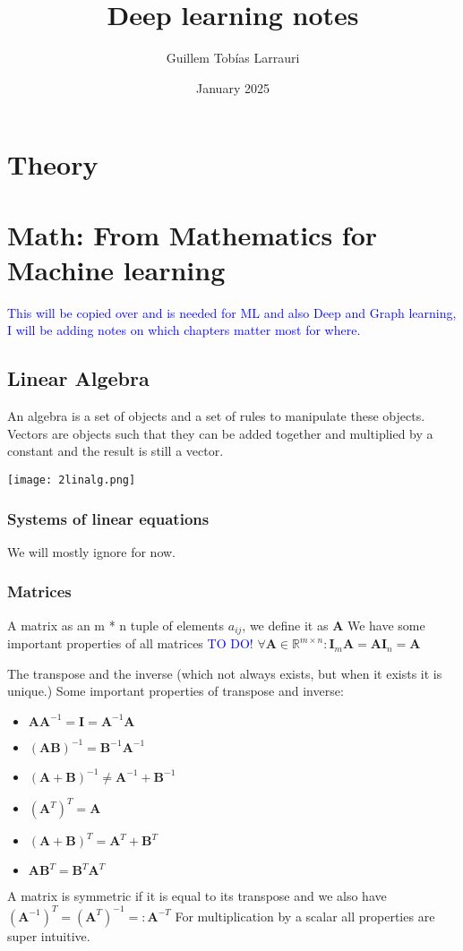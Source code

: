 \documentclass{article}
\title{Deep learning notes}
\author{Guillem Tobías Larrauri}
\date{January 2025}
\newcommand{\tblue}[1]{\textcolor{blue}{#1}}
\begin{document}
\maketitle

\section{Theory}


\section{Math: From Mathematics for Machine learning}
\tblue{This will be copied over and is needed for ML and also Deep and Graph learning,
I will be adding notes on which chapters matter most for where.}

\subsection{Linear Algebra}
An algebra is a set of objects and a set of rules to manipulate these objects.
Vectors are objects such that they can be added together and multiplied by a constant and the result is still a vector.
\begin{center}
    \texttt{[image: 2linalg.png]} %
\end{center}
\subsubsection{Systems of linear equations}
We will mostly ignore for now.

\subsubsection{Matrices}
A matrix as an m * n tuple of elements $a_{ij}$, we define it as \textbf{A}
We have some important properties of all matrices \tblue{TO DO!}
$\forall \textbf{A} \in \mathbb{R}^{m \times n} : \textbf{I}_m \textbf{A} = \textbf{A} \textbf{I}_n = \textbf{A} $

The transpose and the inverse (which not always exists, but when it exists it is unique.)
Some important properties of transpose and inverse:
\begin{itemize}
    \item $\textbf{A} \textbf{A}^{-1} = \textbf{I} = \textbf{A}^{-1}\textbf{A}$
    \item $(\textbf{A}\textbf{B})^{-1} = \textbf{B}^{-1} \textbf{A}^{-1}$
    \item $(\textbf{A} + \textbf{B})^{-1} \neq \textbf{A}^{-1} + \textbf{B}^{-1}$
    \item $(\textbf{A}^T)^{T} = \textbf{A}$
    \item $(\textbf{A} + \textbf{B})^T = \textbf{A}^T + \textbf{B}^T$
    \item $\textbf{AB}^T = \textbf{B}^T \textbf{A}^T$
\end{itemize}
A matrix is symmetric if it is equal to its transpose and we also have $(\textbf{A}^{-1})^T = (\textbf{A}^T)^{-1} =: \textbf{A}^{-T}$
For multiplication by a scalar all properties are super intuitive.
\end{document}
